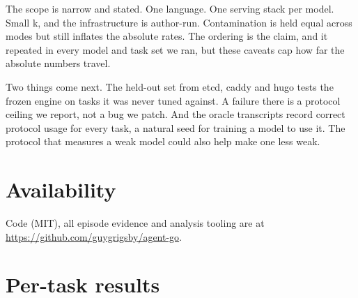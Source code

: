 \documentclass[11pt]{article}
\begin{document}
The scope is narrow and stated. One language. One serving stack per
model. Small k, and the infrastructure is author-run. Contamination is
held equal across modes but still inflates the absolute rates. The
ordering is the claim, and it repeated in every model and task set we
ran, but these caveats cap how far the absolute numbers travel.

Two things come next. The held-out set from etcd, caddy and hugo tests
the frozen engine on tasks it was never tuned against. A failure there
is a protocol ceiling we report, not a bug we patch. And the oracle
transcripts record correct protocol usage for every task, a natural
seed for training a model to use it. The protocol that measures a weak
model could also help make one less weak.

\section{Availability}
Code (MIT), all episode evidence and analysis tooling are at
\url{https://github.com/guygrigsby/agent-go}.

\appendix
\section{Per-task results}
\label{app:pertask}
\label{tab:results}
{\footnotesize}



\end{document}
